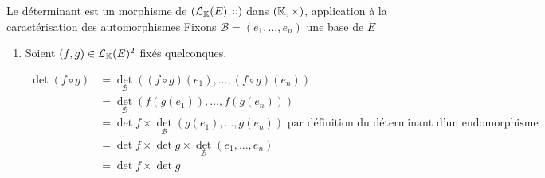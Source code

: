\documentclass{article}
\renewenvironment{question_kholle}[2][ ]
{
	\subsection{\texorpdfstring{#2}{}}
	\notblank{#1}
	{
		\noindent #1
		\bigbreak
	}
	{}
	\begin{proof}
}
{
	\end{proof}
}
\begin{document}
\begin{question_kholle}
  [{\begin{propositions}
          \item $\forall (f, g) \in \mathcal{L}_{\K}(E)^{2}, \ \det (f \circ g) = \det f \times \det g$

          \item $\forall f \in \mathcal{L}_{K}(E), \ f \in \mathcal{GL}_{\K}(E) \iff \det f \neq 0$
        \end{propositions}
      }]{Le déterminant est un morphisme de $(\mathcal{L}_{\mathbb K}(E), \circ)$ dans $(\mathbb K, \times)$, application à la caractérisation des automorphismes}
  Fixons $\mathcal{B}=(e_{1}, \dots, e_{n})$ une base de $E$
  \begin{enumerate}
    \item Soient $(f, g) \in \mathcal{L}_{\mathbb K}(E)^{2}$ fixés quelconques.

          \begin{align*}
            \det (f \circ  g) & = \det_{\mathcal{B}}((f \circ g)(e_{1}), \dots, (f \circ  g)(e_{n}))                                                   \\
                              & = \det_{\mathcal{B}}(f(g(e_{1})), \dots, f(g(e_{n})))                                                                  \\
                              & = \det f \times \det_{\mathcal{B}}(g(e_{1}), \dots, g(e_{n})) \text{ par définition du déterminant d'un endomorphisme} \\
                              & = \det f \times \det g \times \det_{\mathcal{B}}(e_{1}, \dots, e_{n})                                                  \\
                              & = \det f \times \det g
          \end{align*}




\end{enumerate}
\end{question_kholle}
\end{document}
